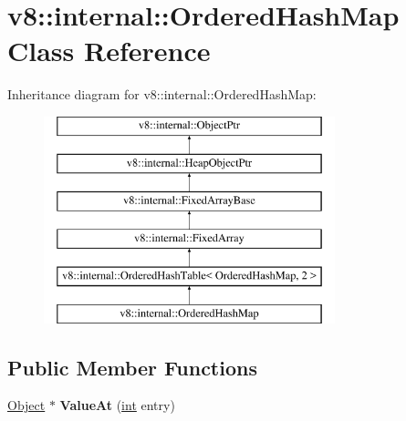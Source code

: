 \hypertarget{classv8_1_1internal_1_1OrderedHashMap}{}\section{v8\+:\+:internal\+:\+:Ordered\+Hash\+Map Class Reference}
\label{classv8_1_1internal_1_1OrderedHashMap}
Inheritance diagram for v8\+:\+:internal\+:\+:Ordered\+Hash\+Map\+:\begin{figure}[H]
\begin{center}
\leavevmode
\includegraphics[height=6.000000cm]{classv8_1_1internal_1_1OrderedHashMap}
\end{center}
\end{figure}
\subsection*{Public Member Functions}
\begin{DoxyCompactItemize}
\item 
\mbox{\label{classv8_1_1internal_1_1OrderedHashMap_acf8dd66c9107446245606bdfc1a29668}} 
\mbox{\hyperlink{classv8_1_1internal_1_1Object}{Object}} $\ast$ {\bfseries Value\+At} (\mbox{\hyperlink{classint}{int}} entry)
\end{DoxyCompactItemize}
